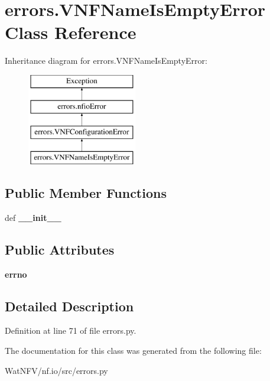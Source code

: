 \hypertarget{classerrors_1_1VNFNameIsEmptyError}{\section{errors.\-V\-N\-F\-Name\-Is\-Empty\-Error Class Reference}
\label{classerrors_1_1VNFNameIsEmptyError}
}
Inheritance diagram for errors.\-V\-N\-F\-Name\-Is\-Empty\-Error\-:\begin{figure}[H]
\begin{center}
\leavevmode
\includegraphics[height=4.000000cm]{classerrors_1_1VNFNameIsEmptyError}
\end{center}
\end{figure}
\subsection*{Public Member Functions}
\begin{DoxyCompactItemize}
\item 
\hypertarget{classerrors_1_1VNFNameIsEmptyError_ae551ab48dee839aa8e2a35b43801e1f9}{def {\bfseries \-\_\-\-\_\-init\-\_\-\-\_\-}}\label{classerrors_1_1VNFNameIsEmptyError_ae551ab48dee839aa8e2a35b43801e1f9}

\end{DoxyCompactItemize}
\subsection*{Public Attributes}
\begin{DoxyCompactItemize}
\item 
\hypertarget{classerrors_1_1VNFNameIsEmptyError_a6c69f18aa91b91ffb8b2483d1e1c4dba}{{\bfseries errno}}\label{classerrors_1_1VNFNameIsEmptyError_a6c69f18aa91b91ffb8b2483d1e1c4dba}

\end{DoxyCompactItemize}


\subsection{Detailed Description}


Definition at line 71 of file errors.\-py.



The documentation for this class was generated from the following file\-:\begin{DoxyCompactItemize}
\item 
Wat\-N\-F\-V/nf.\-io/src/errors.\-py\end{DoxyCompactItemize}
